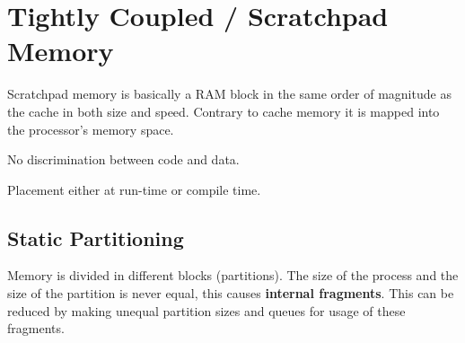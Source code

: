 \section{Tightly Coupled / Scratchpad Memory }
	Scratchpad memory is basically a RAM block in the same order of magnitude as the cache in both size and speed. Contrary to cache memory it is mapped into the processor's memory space.
	
	\begin{compactitem}
	  \item No discrimination between code and data.
	  \item Placement either at run-time or compile time.
	\end{compactitem}
	
	\subsection{Static Partitioning }
		Memory is divided in different blocks (partitions). The size of the process and the size of the partition is never equal, this causes \textbf{internal fragments}. This can be reduced by making unequal partition sizes and queues for usage of these fragments. 
